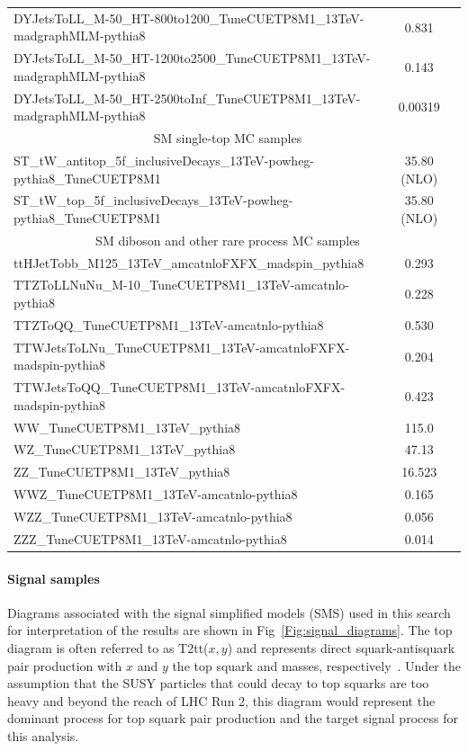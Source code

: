 \begin{table}[hp]
{\begin{tabular}{lcc}
DYJetsToLL\_M-50\_HT-800to1200\_TuneCUETP8M1\_13TeV-madgraphMLM-pythia8 & 0.831 \\
DYJetsToLL\_M-50\_HT-1200to2500\_TuneCUETP8M1\_13TeV-madgraphMLM-pythia8 & 0.143 \\
DYJetsToLL\_M-50\_HT-2500toInf\_TuneCUETP8M1\_13TeV-madgraphMLM-pythia8 & 0.00319 \\
\hline
\multicolumn{2}{c}{SM single-top MC samples} \\ \hline
ST\_tW\_antitop\_5f\_inclusiveDecays\_13TeV-powheg-pythia8\_TuneCUETP8M1 & 35.80 (NLO) \\
ST\_tW\_top\_5f\_inclusiveDecays\_13TeV-powheg-pythia8\_TuneCUETP8M1 & 35.80 (NLO) \\
\hline
\multicolumn{2}{c}{SM diboson and other rare process MC samples} \\ \hline
ttHJetTobb\_M125\_13TeV\_amcatnloFXFX\_madspin\_pythia8 & 0.293 \\
TTZToLLNuNu\_M-10\_TuneCUETP8M1\_13TeV-amcatnlo-pythia8 & 0.228 \\
TTZToQQ\_TuneCUETP8M1\_13TeV-amcatnlo-pythia8 & 0.530 \\
TTWJetsToLNu\_TuneCUETP8M1\_13TeV-amcatnloFXFX-madspin-pythia8 & 0.204 \\
TTWJetsToQQ\_TuneCUETP8M1\_13TeV-amcatnloFXFX-madspin-pythia8 & 0.423 \\
WW\_TuneCUETP8M1\_13TeV\_pythia8 & 115.0 \\
WZ\_TuneCUETP8M1\_13TeV\_pythia8 & 47.13 \\
ZZ\_TuneCUETP8M1\_13TeV\_pythia8 & 16.523 \\
WWZ\_TuneCUETP8M1\_13TeV-amcatnlo-pythia8 & 0.165 \\
WZZ\_TuneCUETP8M1\_13TeV-amcatnlo-pythia8 & 0.056 \\
ZZZ\_TuneCUETP8M1\_13TeV-amcatnlo-pythia8 & 0.014 \\
\hline \hline
\end{tabular}
}
\end{table}

\paragraph{Signal samples}

Diagrams associated with the signal simplified models (SMS) used in this search for interpretation of the results are shown in Fig~\ref{Fig:signal_diagrams}. The top diagram is often referred to as T2tt($x,y$) and represents direct squark-antisquark pair production with $x$ and $y$ the top squark and \chiOneZero masses, respectively~\cite{CMS-SMS-paper}. Under the assumption that the SUSY particles that could decay to top squarks are too heavy and beyond the reach of LHC Run 2, this diagram would represent the dominant process for top squark pair production and the target signal process for this analysis.

